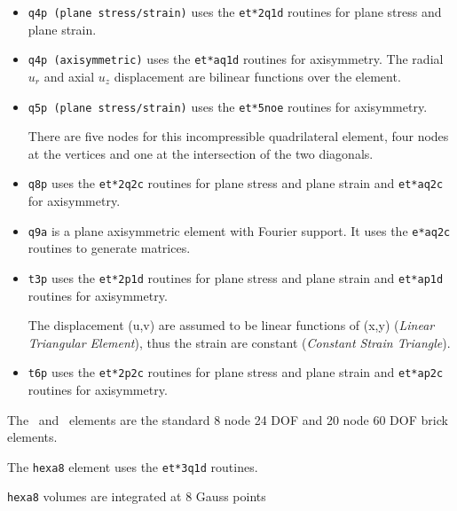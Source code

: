 \begin{itemize}
\item {\tt q4p (plane stress/strain)} uses the {\tt et*2q1d} routines for plane stress and plane strain. 

\item {\tt q4p (axisymmetric)} uses the {\tt et*aq1d} routines for axisymmetry. The radial $u_r$ and axial  $u_z$ displacement are bilinear functions over the element. 


\item {\tt q5p (plane stress/strain)} uses the {\tt et*5noe} routines for axisymmetry.

There are five nodes for this incompressible quadrilateral element, four nodes at the vertices and one at the intersection of the two diagonals.

\item {\tt q8p} uses the {\tt et*2q2c} routines for plane stress and plane strain and {\tt et*aq2c} for axisymmetry.

\item {\tt q9a} is a plane axisymmetric element with Fourier support. It uses  the {\tt e*aq2c} routines to generate matrices.

\item {\tt t3p} uses the {\tt et*2p1d} routines for plane stress and plane strain and  {\tt et*ap1d} routines for axisymmetry.

The displacement (u,v) are assumed to
   be linear functions of (x,y) ({\it{Linear Triangular Element}}),
   thus the strain are constant ({\it{Constant Strain Triangle}}).

\item {\tt t6p}  uses the {\tt et*2p2c} routines for plane stress and plane strain and {\tt et*ap2c} routines for axisymmetry.

\end{itemize}




The \hexah\ and \hexav\  elements are the standard 8 node 24 DOF and
20 node 60 DOF brick elements. 

The {\tt hexa8} element uses the {\tt et*3q1d} routines.

{\tt hexa8} volumes are integrated at 8 Gauss points


